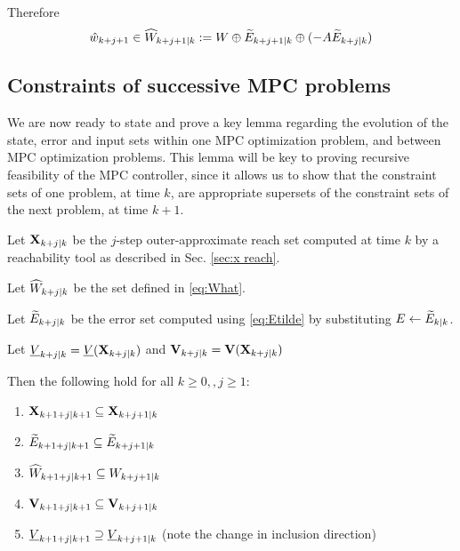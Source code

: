 Therefore 
\begin{equation}
\label{eq:What}
\hat{w}_{k+j+1} \in \widehat{W}_{k+j+1|k} := W \oplus \widetilde{E}_{k+j+1|k} \oplus(-A\widetilde{E}_{k+j|k})
\end{equation}

\subsection{Constraints of successive MPC problems}
\label{sec:inclusions statement}
We are now ready to state and prove a key lemma regarding the evolution of the state, error and input sets within one MPC optimization problem, and between MPC optimization problems. 
This lemma will be key to proving recursive feasibility of the MPC controller, since it allows us to show that the constraint sets of one problem, at time $k$, are appropriate supersets of the constraint sets of the next problem, at time $k+1$. 

\begin{lemma}
	\label{lem:set inclusions}
	Let $\mathbf{X}_{k+j|k}$ be the $j$-step outer-approximate reach set computed at time $k$ by a reachability tool as described in Sec. \ref{sec:x reach}.
	
	Let $\widehat{W}_{k+j|k}$ be the set defined in \eqref{eq:What}.
	
	Let $\widetilde{E}_{k+j|k}$ be the error set computed using \eqref{eq:Etilde} by substituting $E \leftarrow \widetilde{E}_{k|k}$.
	
	Let $\underline{V}_{k+j|k} = \underline{V}(\mathbf{X}_{k+j|k})$ and $\mathbf{V}_{k+j|k} = \mathbf{V}(\mathbf{X}_{k+j|k})$ 

Then the following hold for all $k \geq 0, ,j \geq 1$:
\begin{enumerate}
	\item $\mathbf{X}_{k+1+j|k+1} \subseteq \mathbf{X}_{k+j+1|k}$
	\label{set:X}
	\item $\widetilde{E}_{k+1+j|k+1} \subseteq \widetilde{E}_{k+j+1|k}$
	\label{set:tE}
	\item $\widehat{W}_{k+1+j|k+1} \subseteq {W}_{k+j+1|k}$
	\label{set:What}
	\item $\mathbf{V}_{k+1+j|k+1} \subseteq \mathbf{V}_{k+j+1|k}$
	\label{set:oaV}
	\item $\underline{V}_{k+1+j|k+1} \supseteq \underline{V}_{k+j+1|k}$ (note the change in inclusion direction)
	\label{set:uaV}		
\end{enumerate} 
\end{lemma} 

